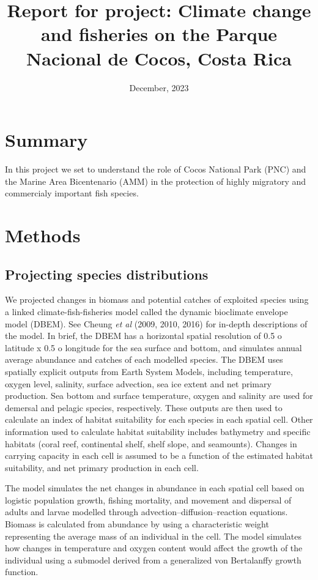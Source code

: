 \documentclass[
]{article}
\title{Report for project: Climate change and fisheries on the Parque Nacional de Cocos, Costa Rica}
\author{}
\date{\vspace{-2.5em}December, 2023}
\begin{document}
\maketitle

\hypertarget{summary}{%
\section{Summary}\label{summary}}

In this project we set to understand the role of Cocos National Park (PNC) and the Marine Area Bicentenario (AMM) in the protection of highly migratory and commercialy important fish species.

\hypertarget{methods}{%
\section{Methods}\label{methods}}

\hypertarget{projecting-species-distributions}{%
\subsection{Projecting species distributions}\label{projecting-species-distributions}}

We projected changes in biomass and potential catches of exploited species using a linked climate-fish-fisheries model called the dynamic bioclimate envelope model (DBEM). See Cheung \emph{et al }(2009, 2010, 2016) for in-depth descriptions of the model. In brief, the DBEM has a horizontal spatial resolution of 0.5 o latitude x 0.5 o longitude for the sea surface and bottom, and simulates annual average abundance and catches of each modelled species. The DBEM uses spatially explicit outputs from Earth System Models, including temperature, oxygen level, salinity, surface advection, sea ice extent and net primary production. Sea bottom and surface temperature, oxygen and salinity are used for demersal and pelagic species, respectively. These outputs are then used to calculate an index of habitat suitability for each species in each spatial cell. Other information used to calculate habitat suitability includes bathymetry and specific habitats (coral reef, continental shelf, shelf slope, and seamounts). Changes in carrying capacity in each cell is assumed to be a function of the estimated habitat suitability, and net primary production in each cell.

The model simulates the net changes in abundance in each spatial cell based on logistic population growth, fishing mortality, and movement and dispersal of adults and larvae modelled through advection--diffusion--reaction equations. Biomass is calculated from abundance by using a characteristic weight representing the average mass of an individual in the cell. The model simulates how changes in temperature and oxygen content would affect the growth of the individual using a submodel derived from a generalized von Bertalanffy growth function.
\end{document}
